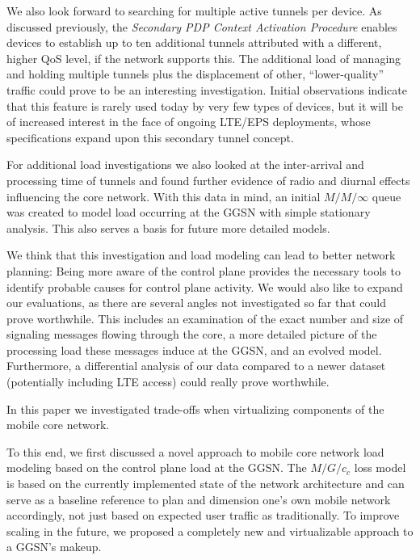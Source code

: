 We also look forward to searching for multiple active tunnels per device. As discussed previously, the \textit{Secondary PDP Context Activation Procedure} enables devices to establish up to ten additional tunnels attributed with a different, higher QoS level, if the network supports this. The additional load of managing and holding multiple tunnels plus the displacement of other, ``lower-quality'' traffic could prove to be an interesting investigation. Initial observations indicate that this feature is rarely used today by very few types of devices, but it will be of increased interest in the face of ongoing LTE/EPS deployments, whose specifications expand upon this secondary tunnel concept.

For additional load investigations we also looked at the inter-arrival and processing time of tunnels and found further evidence of radio and diurnal effects influencing the core network. With this data in mind, an initial $M/M/\infty$ queue was created to model load occurring at the \gls{GGSN} with simple stationary analysis. This also serves a basis for future more detailed models.

We think that this investigation and load modeling can lead to better network planning: Being more aware of the control plane provides the necessary tools to identify probable causes for control plane activity. We would also like to expand our evaluations, as there are several angles not investigated so far that could prove worthwhile. This includes an examination of the exact number and size of signaling messages flowing through the core, a more detailed picture of the processing load these messages induce at the \gls{GGSN}, and an evolved model. Furthermore, a differential analysis of our data compared to a newer dataset (potentially including \gls{LTE} access) could really prove worthwhile.



In this paper we investigated trade-offs when virtualizing components of the mobile core network.

To this end, we first discussed a novel approach to mobile core network load modeling based on the control plane load at the \gls{GGSN}. The $M/G/c_c$ loss model is based on the currently implemented state of the network architecture and can serve as a baseline reference to plan and dimension one's own mobile network accordingly, not just based on expected user traffic as traditionally. To improve scaling in the future, we proposed a completely new and virtualizable approach to a \gls{GGSN}'s makeup.

